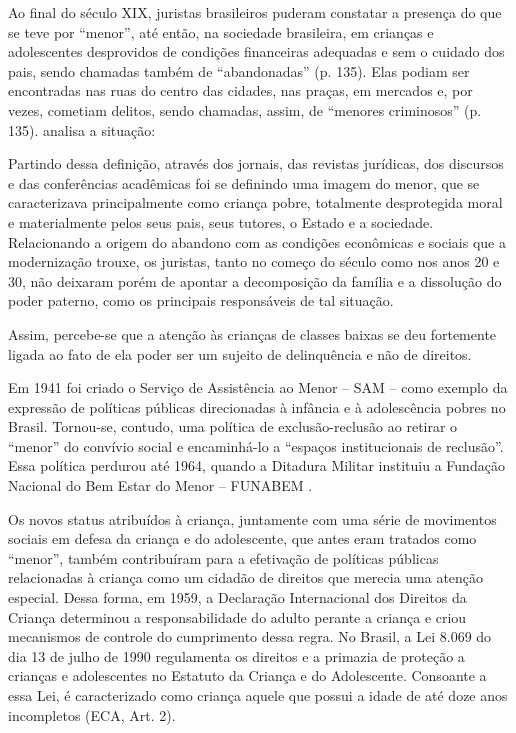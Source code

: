 Ao final do século XIX, juristas brasileiros puderam constatar a presença do que se teve por ``menor'', até então, na sociedade brasileira, em crianças e adolescentes desprovidos de condições financeiras adequadas e sem o cuidado dos pais, sendo chamadas também de ``abandonadas'' (p. 135). Elas podiam ser encontradas nas ruas do centro das cidades, nas praças, em mercados e, por vezes, cometiam delitos, sendo chamadas, assim, de ``menores criminosos'' (p. 135).  analisa a situação:

\begin{citacao}
	Partindo dessa definição, através dos jornais, das revistas jurídicas, dos discursos e das conferências acadêmicas foi se definindo uma imagem do menor, que se caracterizava principalmente como criança pobre, totalmente desprotegida moral e materialmente pelos seus pais, seus tutores, o Estado e a sociedade. Relacionando a origem do abandono com as condições econômicas e sociais que a modernização trouxe, os juristas, tanto no começo do século como nos anos 20 e 30, não deixaram porém de apontar a decomposição da família e a dissolução do poder paterno, como os principais responsáveis de tal situação.
\end{citacao}

Assim, percebe-se que a atenção às crianças de classes baixas se deu fortemente ligada ao fato de ela poder ser um sujeito de delinquência e não de direitos.

Em 1941 foi criado o Serviço de Assistência ao Menor -- SAM -- como exemplo da expressão de políticas públicas direcionadas à infância e à adolescência pobres no Brasil. Tornou-se, contudo, uma política de exclusão-reclusão ao retirar o ``menor'' do convívio social e encaminhá-lo a ``espaços institucionais de reclusão''. Essa política perdurou até 1964, quando a Ditadura Militar instituiu a Fundação Nacional do Bem Estar do Menor -- FUNABEM \cite[p. 54]{VASCONCELOS2002}.

Os novos status atribuídos à criança, juntamente com uma série de movimentos sociais em defesa da criança e do adolescente, que antes eram tratados como ``menor'', também contribuíram para a efetivação de políticas públicas relacionadas à criança como um cidadão de direitos que merecia uma atenção especial. Dessa forma, em 1959, a Declaração Internacional dos Direitos da Criança determinou a responsabilidade do adulto perante a criança e criou mecanismos de controle do cumprimento dessa regra. No Brasil, a Lei 8.069 do dia 13 de julho de 1990 regulamenta os direitos e a primazia de proteção a crianças e adolescentes no Estatuto da Criança e do Adolescente. Consoante a essa Lei, é caracterizado como criança aquele que possui a idade de até doze anos incompletos (ECA, Art. 2\textordmasculine).

